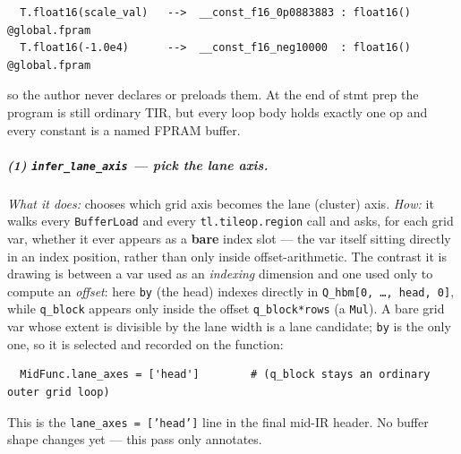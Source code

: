 \documentclass[
  10pt,
]{article}
\begin{document}
\begin{verbatim}
  T.float16(scale_val)   -->  __const_f16_0p0883883 : float16() @global.fpram
  T.float16(-1.0e4)      -->  __const_f16_neg10000  : float16() @global.fpram
\end{verbatim}

so the author never declares or preloads them. At the end of stmt prep
the program is still ordinary TIR, but every loop body holds exactly one
op and every constant is a named FPRAM buffer.

\subparagraph{(1) \texttt{infer\_lane\_axis} --- pick the lane
axis.}\label{fa-infer-lane} \emph{What it does:} chooses which grid axis
becomes the lane (cluster) axis. \emph{How:} it walks every
\texttt{BufferLoad} and every \texttt{tl.tileop.region} call and asks,
for each grid var, whether it ever appears as a \textbf{bare} index slot
--- the var itself sitting directly in an index position, rather than
only inside offset-arithmetic. The contrast it is drawing is between a
var used as an \emph{indexing} dimension and one used only to compute an
\emph{offset}: here \texttt{by} (the head) indexes directly in
\texttt{Q\_hbm[0, \dots, head, 0]}, while \texttt{q\_block} appears only
inside the offset \texttt{q\_block*rows} (a \texttt{Mul}). A bare grid
var whose extent is divisible by the lane width is a lane candidate;
\texttt{by} is the only one, so it is selected and recorded on the
function:

\begin{verbatim}
  MidFunc.lane_axes = ['head']        # (q_block stays an ordinary outer grid loop)
\end{verbatim}

This is the \texttt{lane\_axes = ['head']} line in the final mid-IR
header. No buffer shape changes yet --- this pass only annotates.
\end{document}
